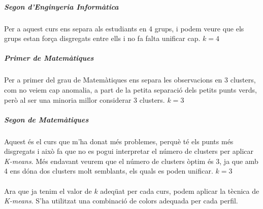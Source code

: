\documentclass[12pt,a4paper,catalan]{article}
\begin{document}
\subparagraph{Segon d'Enginyeria Informàtica}
Per a aquest curs ens separa als estudiants en 4 grups, i podem veure que els grups estan força disgregats entre ells i no fa falta unificar cap.  $k=4$

\subparagraph{Primer de Matemàtiques} 
Per a primer del grau de Matemàtiques ens separa les observacions en 3 clusters, com no veiem cap anomalia, a part de la petita separació dels petits punts verds, però al ser una minoria millor considerar 3 clusters.  $k=3$

\subparagraph{Segon de Matemàtiques}
Aquest és el curs que m'ha donat més problemes, perquè té els punts més disgregats i això fa que no es pogui interpretar el número de clusters per aplicar \textit{K-means}. Més endavant veurem que el número de clusters òptim és 3, ja que amb 4 ens dóna dos clusters molt semblants, els quals es poden unificar. $k=3$
\\
\\
Ara que ja tenim el valor de $k$ adeqüat per cada curs, podem aplicar la tècnica de \textit{K-means}. S'ha utilitzat una combinació de colors adequada per cada perfil.
\end{document}
